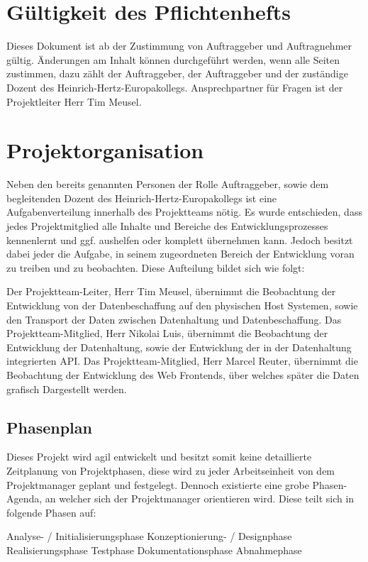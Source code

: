 \section{Gültigkeit des Pflichtenhefts}

Dieses Dokument ist ab der Zustimmung von Auftraggeber und Auftragnehmer
gültig. Änderungen am Inhalt können durchgeführt werden, wenn alle Seiten
zustimmen, dazu zählt der Auftraggeber, der Auftraggeber und der zuständige
Dozent des Heinrich-Hertz-Europakollegs. Ansprechpartner für Fragen ist der
Projektleiter Herr Tim Meusel.

\section{Projektorganisation}

Neben den bereits genannten Personen der Rolle Auftraggeber, sowie dem
begleitenden Dozent des Heinrich-Hertz-Europakollegs ist eine
Aufgabenverteilung innerhalb des Projektteams nötig. Es wurde entschieden, dass
jedes Projektmitglied alle Inhalte und Bereiche des Entwicklungsprozesses
kennenlernt und ggf. aushelfen oder komplett übernehmen kann. Jedoch besitzt
dabei jeder die Aufgabe, in seinem zugeordneten Bereich der Entwicklung voran
zu treiben und zu beobachten. Diese Aufteilung bildet sich wie folgt:
\begin{outline}
  \1 Der Projektteam-Leiter, Herr Tim Meusel, übernimmt die Beobachtung der
    \2 Entwicklung von der Datenbeschaffung auf den physischen Host Systemen,
    \2 sowie den Transport der Daten zwischen Datenhaltung und Datenbeschaffung.
  \1 Das Projektteam-Mitglied, Herr Nikolai Luis, übernimmt die Beobachtung der
    \2 Entwicklung der Datenhaltung,
    \2 sowie der Entwicklung der in der Datenhaltung integrierten API.
  \1 Das Projektteam-Mitglied, Herr Marcel Reuter, übernimmt die Beobachtung der
    \2 Entwicklung des Web Frontends, über welches später die Daten grafisch
    Dargestellt werden.
\end{outline}

\subsection{Phasenplan}

Dieses Projekt wird agil entwickelt und besitzt somit keine detaillierte
Zeitplanung von Projektphasen, diese wird zu jeder Arbeitseinheit von dem
Projektmanager geplant und festgelegt. Dennoch existierte eine grobe
Phasen-Agenda, an welcher sich der Projektmanager orientieren wird. Diese
teilt sich in folgende Phasen auf:
\begin{outline}
  \1 Analyse- / Initialisierungsphase
  \1 Konzeptionierung- / Designphase
  \1 Realisierungsphase
  \1 Testphase
  \1 Dokumentationsphase
  \1 Abnahmephase
\end{outline}

